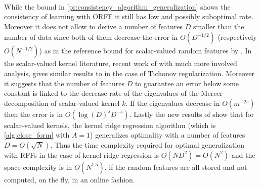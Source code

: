 \paragraph{}
While the bound in \cref{pr:consistency_algorithm_generalization} shows the
consistency of learning with \acs{ORFF} it still has low and possibly
suboptimal rate. Moreover it does not allow to derive a number of features $D$
smaller than the number of data since both of them decrease the error in
$O(D^{-1/2})$ (respectively $O(N^{-1/2})$) as in the reference bound for
scalar-valued random features by \citet{rahimi2009weighted}. In the
scalar-valued kernel literature, recent work of \citet{bach2015equivalence}
with much more involved analysis, gives similar results to
\citet{rahimi2009weighted} in the case of Tichonov regularization.  Moreover it
suggests that the number of features $D$ to guarantee an error below some
constant is linked to the decrease rate of the eigenvalues of the Mercer
decomposition of scalar-valued kernel $k$. If the eigenvalues decrease in
$O(m^{-2s})$ then the error is in $O\left(\log(D)^s D^{-s}\right)$. Lastly the
new results of \citet{rudi2016generalization} show that for scalar-valued
kernels, the kernel ridge regression algorithm (which is \cref{alg:close_form}
with $A = 1$) generalizes optimality with a number of features $D=O(\sqrt{N})$.
Thus the time complexity required for optimal generalization with \acsp{RFF} in
the case of kernel ridge regression is $O(ND^2)=O(N^{2})$ and the space
complexity is in $O(N^{1.5})$, if the random features are all stored and not
computed, on the fly, in an online fashion.

\chapterend
